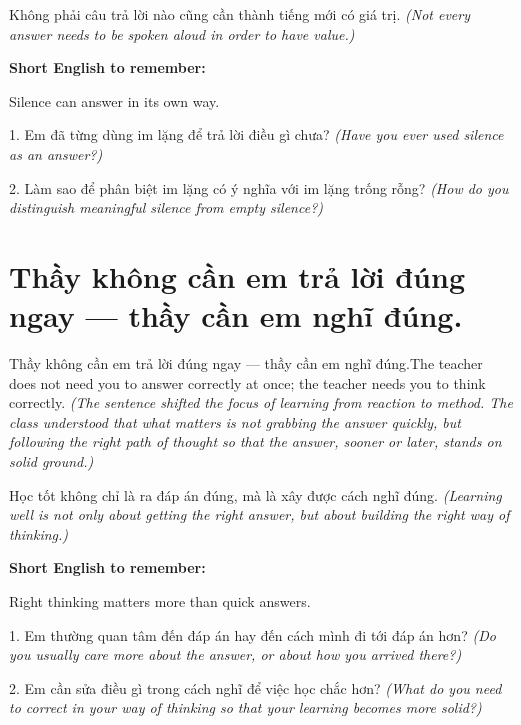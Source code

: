 \begin{baihoc}
Không phải câu trả lời nào cũng cần thành tiếng mới có giá trị.
\textit{(Not every answer needs to be spoken aloud in order to have value.)}
\end{baihoc}

\begin{ghinhoanh}
\textbf{Short English to remember:}

Silence can answer in its own way.

\end{ghinhoanh}

\begin{tuhocnhanh}
1. Em đã từng dùng im lặng để trả lời điều gì chưa? \textit{(Have you ever used silence as an answer?)}

2. Làm sao để phân biệt im lặng có ý nghĩa với im lặng trống rỗng? \textit{(How do you distinguish meaningful silence from empty silence?)}
\end{tuhocnhanh}
\ngancach


\section{Thầy không cần em trả lời đúng ngay — thầy cần em nghĩ đúng.}
\begin{truyen}{Thầy không cần em trả lời đúng ngay — thầy cần em nghĩ đúng.}{The teacher does not need you to answer correctly at once; the teacher needs you to think correctly.}
\textit{(The sentence shifted the focus of learning from reaction to method. The class understood that what matters is not grabbing the answer quickly, but following the right path of thought so that the answer, sooner or later, stands on solid ground.)}
\end{truyen}

\begin{baihoc}
Học tốt không chỉ là ra đáp án đúng, mà là xây được cách nghĩ đúng.
\textit{(Learning well is not only about getting the right answer, but about building the right way of thinking.)}
\end{baihoc}

\begin{ghinhoanh}
\textbf{Short English to remember:}

Right thinking matters more than quick answers.

\end{ghinhoanh}

\begin{tuhocnhanh}
1. Em thường quan tâm đến đáp án hay đến cách mình đi tới đáp án hơn? \textit{(Do you usually care more about the answer, or about how you arrived there?)}

2. Em cần sửa điều gì trong cách nghĩ để việc học chắc hơn? \textit{(What do you need to correct in your way of thinking so that your learning becomes more solid?)}
\end{tuhocnhanh}
\ngancach
